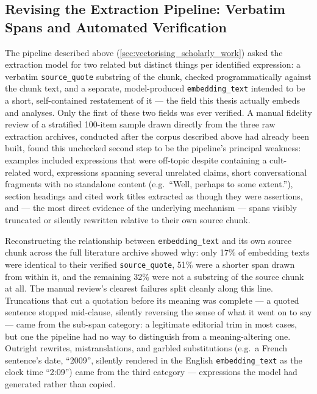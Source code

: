\subsection{Revising the Extraction Pipeline: Verbatim Spans and Automated Verification}\label{sec:extraction_v2}

The pipeline described above (\ref{sec:vectorising_scholarly_work}) asked the extraction model for two related but distinct things per identified expression: a verbatim \texttt{source\_quote} substring of the chunk, checked programmatically against the chunk text, and a separate, model-produced \texttt{embedding\_text} intended to be a short, self-contained restatement of it — the field this thesis actually embeds and analyses. Only the first of these two fields was ever verified. A manual fidelity review of a stratified 100-item sample drawn directly from the three raw extraction archives, conducted after the corpus described above had already been built, found this unchecked second step to be the pipeline's principal weakness: examples included expressions that were off-topic despite containing a cult-related word, expressions spanning several unrelated claims, short conversational fragments with no standalone content (e.g.\ \enquote{Well, perhaps to some extent.}), section headings and cited work titles extracted as though they were assertions, and — the most direct evidence of the underlying mechanism — spans visibly truncated or silently rewritten relative to their own source chunk.

Reconstructing the relationship between \texttt{embedding\_text} and its own source chunk across the full literature archive showed why: only 17\% of embedding texts were identical to their verified \texttt{source\_quote}, 51\% were a shorter span drawn from within it, and the remaining 32\% were not a substring of the source chunk at all. The manual review's clearest failures split cleanly along this line. Truncations that cut a quotation before its meaning was complete — a quoted sentence stopped mid-clause, silently reversing the sense of what it went on to say — came from the sub-span category: a legitimate editorial trim in most cases, but one the pipeline had no way to distinguish from a meaning-altering one. Outright rewrites, mistranslations, and garbled substitutions (e.g.\ a French sentence's date, \enquote{2009}, silently rendered in the English \texttt{embedding\_text} as the clock time \enquote{2:09}) came from the third category — expressions the model had generated rather than copied.

